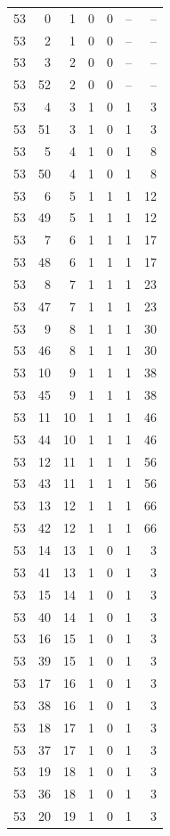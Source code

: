 \begin{longtable}{rrrrrrr}
53 & 0 & 1 & 0 & 0 & -- & --\\
53 & 2 & 1 & 0 & 0 & -- & --\\
53 & 3 & 2 & 0 & 0 & -- & --\\
53 & 52 & 2 & 0 & 0 & -- & --\\
53 & 4 & 3 & 1 & 0 & 1 & 3\\
53 & 51 & 3 & 1 & 0 & 1 & 3\\
53 & 5 & 4 & 1 & 0 & 1 & 8\\
53 & 50 & 4 & 1 & 0 & 1 & 8\\
53 & 6 & 5 & 1 & 1 & 1 & 12\\
53 & 49 & 5 & 1 & 1 & 1 & 12\\
53 & 7 & 6 & 1 & 1 & 1 & 17\\
53 & 48 & 6 & 1 & 1 & 1 & 17\\
53 & 8 & 7 & 1 & 1 & 1 & 23\\
53 & 47 & 7 & 1 & 1 & 1 & 23\\
53 & 9 & 8 & 1 & 1 & 1 & 30\\
53 & 46 & 8 & 1 & 1 & 1 & 30\\
53 & 10 & 9 & 1 & 1 & 1 & 38\\
53 & 45 & 9 & 1 & 1 & 1 & 38\\
53 & 11 & 10 & 1 & 1 & 1 & 46\\
53 & 44 & 10 & 1 & 1 & 1 & 46\\
53 & 12 & 11 & 1 & 1 & 1 & 56\\
53 & 43 & 11 & 1 & 1 & 1 & 56\\
53 & 13 & 12 & 1 & 1 & 1 & 66\\
53 & 42 & 12 & 1 & 1 & 1 & 66\\
53 & 14 & 13 & 1 & 0 & 1 & 3\\
53 & 41 & 13 & 1 & 0 & 1 & 3\\
53 & 15 & 14 & 1 & 0 & 1 & 3\\
53 & 40 & 14 & 1 & 0 & 1 & 3\\
53 & 16 & 15 & 1 & 0 & 1 & 3\\
53 & 39 & 15 & 1 & 0 & 1 & 3\\
53 & 17 & 16 & 1 & 0 & 1 & 3\\
53 & 38 & 16 & 1 & 0 & 1 & 3\\
53 & 18 & 17 & 1 & 0 & 1 & 3\\
53 & 37 & 17 & 1 & 0 & 1 & 3\\
53 & 19 & 18 & 1 & 0 & 1 & 3\\
53 & 36 & 18 & 1 & 0 & 1 & 3\\
53 & 20 & 19 & 1 & 0 & 1 & 3\\

\end{longtable}
